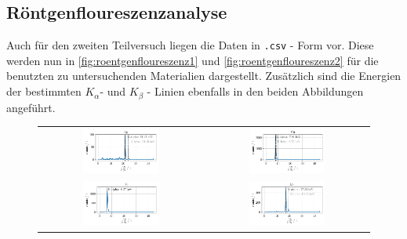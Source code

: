 \documentclass[ngerman]{scrartcl}
\begin{document}
\subsection{Röntgenfloureszenzanalyse}
\label{subsec:roentgenfloureszenzanalyse}
Auch für den zweiten Teilversuch liegen die Daten in \texttt{.csv} - Form vor. Diese werden nun in \autoref{fig:roentgenfloureszenz1} und \autoref{fig:roentgenfloureszenz2} für die benutzten zu untersuchenden Materialien dargestellt. Zusätzlich sind die Energien der bestimmten $K_{\alpha}$- und $K_{\beta}$ - Linien ebenfalls in den beiden Abbildungen angeführt.
\begin{figure}[H]
    \centering
    \begin{tabular}{cc}
      \includegraphics[width=0.48\textwidth]{../plots/roentgen_data_1.pdf} &
      \includegraphics[width=0.48\textwidth]{../plots/roentgen_data_2.pdf} \\
      \includegraphics[width=0.48\textwidth]{../plots/roentgen_data_3.pdf} &
      \includegraphics[width=0.48\textwidth]{../plots/roentgen_data_4.pdf} \\

\end{tabular}
\end{figure}
\end{document}
